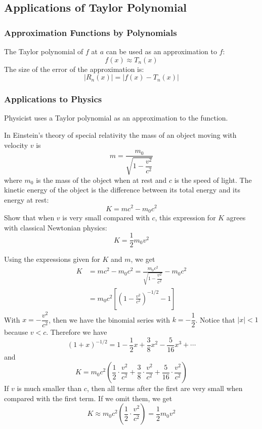 \subsection{Applications of Taylor Polynomial}

\subsubsection*{Approximation Functions by Polynomials}

The Taylor polynomial of \(f\) at \(a\) can be used as an approximation to
\(f\):
\[f(x)\approx T_n(x)\]
The size of the error of the approximation is:
\[|R_n(x)|=|f(x)-T_n(x)|\]

\subsubsection*{Applications to Physics}

Physicist uses a Taylor polynomial as an approximation to the function.
\begin{problem}
    In Einstein's theory of special relativity the mass of an object moving
    with velocity \(v\) is
    \[m=\frac{m_0}{\sqrt{1-\dfrac{v^2}{c^2}}}\]
    where \(m_0\) is the mass of the object when at rest and \(c\) is the
    speed of light.
    The kinetic energy of the object is the difference between its total
    energy and its energy at rest:
    \[K=mc^2-m_0c^2\]
    Show that when \(v\) is very small compared with \(c\), this
    expression for \(K\) agrees with classical Newtonian physics:
    \[K=\frac{1}{2}m_0v^2\]
\end{problem}
\begin{solution}
    Using the expressions given for \(K\) and \(m\), we get
    \begin{align*}
        K &= mc^2-m_0c^2=\frac{m_0c^2}{\sqrt{1-\dfrac{v^2}{c^2}}}-m_0c^2 \\
        &= m_0c^2\left[\left(1-\frac{v^2}{c^2}\right)^{-1/2}-1\right]
    \end{align*}
    With \(x=-\dfrac{v^2}{c^2}\), then we have the binomial series with
    \(k=-\dfrac{1}{2}\).
    Notice that \(|x|<1\) because \(v<c\).
    Therefore we have
    \[(1+x)^{-1/2}=1-\frac{1}{2}x+\frac{3}{8}x^2-\frac{5}{16}x^3+\cdots\]
    and
    \[K=m_0c^2\left(\frac{1}{2}\cdot\frac{v^2}{c^2}
    +\frac{3}{8}\cdot\frac{v^2}{c^2}+\frac{5}{16}\cdot\frac{v^2}{c^2}\right)\]
    If \(v\) is much smaller than \(c\), then all terms after the first are
    very small when compared with the first term.
    If we omit them, we get
    \[K\approx m_0c^2\left(\frac{1}{2}\cdot\frac{v^2}{c^2}\right)
    =\frac{1}{2}m_0v^2\]
\end{solution}